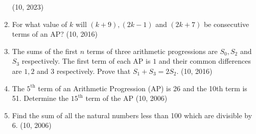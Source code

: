 \begin{enumerate}[label=\thesubsection.\arabic*,ref=\thesubsection.\theenumi,itemsep=1pt]
	 \hfill (10, 2023)
\item For what value of $k$ will $(k+9), (2k-1)$ and $( 2k+7)$ be consecutive terms of an AP?
\hfill (10, 2016)
\item The sums of the first $n$ terms of three arithmetic progressions are $S_0, S_2$ and $S_3$ respectively. The first term of each AP is $1$ and their common differences are $1, 2$ and $3$ respectively. Prove that $S_1 + S_3 = 2S_2$.
								\hfill (10, 2016)
\item The $5^{\text{th}}$ term of an Arithmetic Progression (AP) is 26 and the 10th term is 51. Determine the $15^{\text{th}}$ term of the AP
    \hfill (10, 2006)
\item Find the sum of all the natural numbers less than 100 which are divisible by 6.
    \hfill (10, 2006)
\end{enumerate}
%
